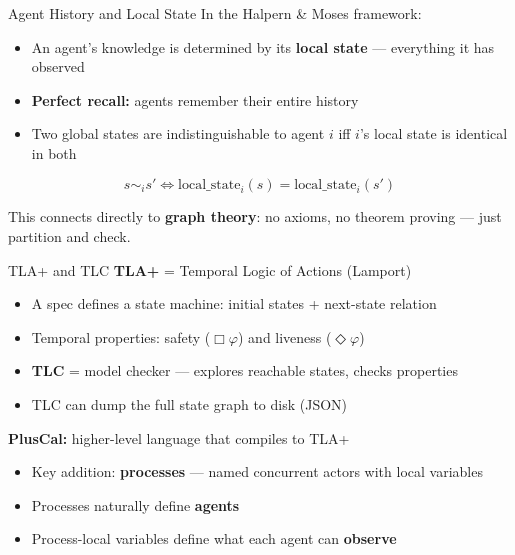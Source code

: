 \documentclass[aspectratio=169,12pt]{beamer}
\begin{document}
\begin{frame}{Agent History and Local State}
In the Halpern \& Moses framework:
\begin{itemize}
\item An agent's knowledge is determined by its \textbf{local state} --- everything it has observed
\item \textbf{Perfect recall:} agents remember their entire history
\item Two global states are indistinguishable to agent $i$ iff $i$'s local state is identical in both
\end{itemize}

\vspace{0.8em}
$$s \sim_i s' \iff \text{local\_state}_i(s) = \text{local\_state}_i(s')$$

\vspace{0.8em}
This connects directly to \textbf{graph theory}: no axioms, no theorem proving --- just partition and check.
\end{frame}


\begin{frame}{TLA+ and TLC}
\textbf{TLA+} = Temporal Logic of Actions (Lamport)
\begin{itemize}
\item A spec defines a state machine: initial states + next-state relation
\item Temporal properties: safety ($\Box\varphi$) and liveness ($\Diamond\varphi$)
\item \textbf{TLC} = model checker --- explores reachable states, checks properties
\item TLC can dump the full state graph to disk (JSON)
\end{itemize}

\vspace{0.5em}
\textbf{PlusCal:} higher-level language that compiles to TLA+
\begin{itemize}
\item Key addition: \textbf{processes} --- named concurrent actors with local variables
\item Processes naturally define \textbf{agents}
\item Process-local variables define what each agent can \textbf{observe}
\end{itemize}
\end{frame}
\end{document}
